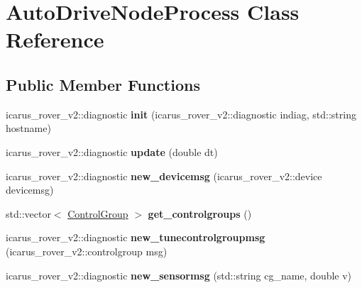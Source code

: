 \hypertarget{classAutoDriveNodeProcess}{}\section{Auto\+Drive\+Node\+Process Class Reference}
\label{classAutoDriveNodeProcess}
\subsection*{Public Member Functions}
\begin{DoxyCompactItemize}
\item 
\mbox{\label{classAutoDriveNodeProcess_ac5470b9ace00798dcba9156744331bd9}} 
icarus\+\_\+rover\+\_\+v2\+::diagnostic {\bfseries init} (icarus\+\_\+rover\+\_\+v2\+::diagnostic indiag, std\+::string hostname)
\item 
\mbox{\label{classAutoDriveNodeProcess_a43a8b8d6cef718040544b372aaa267f8}} 
icarus\+\_\+rover\+\_\+v2\+::diagnostic {\bfseries update} (double dt)
\item 
\mbox{\label{classAutoDriveNodeProcess_aa5551e690ded202dc28faae159c9180d}} 
icarus\+\_\+rover\+\_\+v2\+::diagnostic {\bfseries new\+\_\+devicemsg} (icarus\+\_\+rover\+\_\+v2\+::device devicemsg)
\item 
\mbox{\label{classAutoDriveNodeProcess_a86d47aca19ba5b94aaa058497422a2a6}} 
std\+::vector$<$ \hyperlink{structControlGroup}{Control\+Group} $>$ {\bfseries get\+\_\+controlgroups} ()
\item 
\mbox{\label{classAutoDriveNodeProcess_a71f699a1cce6d74d8592d956fa9a6cc0}} 
icarus\+\_\+rover\+\_\+v2\+::diagnostic {\bfseries new\+\_\+tunecontrolgroupmsg} (icarus\+\_\+rover\+\_\+v2\+::controlgroup msg)
\item 
\mbox{\label{classAutoDriveNodeProcess_a4f8e7e4315d6892076b452c183aa5bfe}} 
icarus\+\_\+rover\+\_\+v2\+::diagnostic {\bfseries new\+\_\+sensormsg} (std\+::string cg\+\_\+name, double v)
\item 
\mbox{\label{classAutoDriveNodeProcess_a027ac56e897c17571780b128776f8a5b}} 

\end{DoxyCompactItemize}
